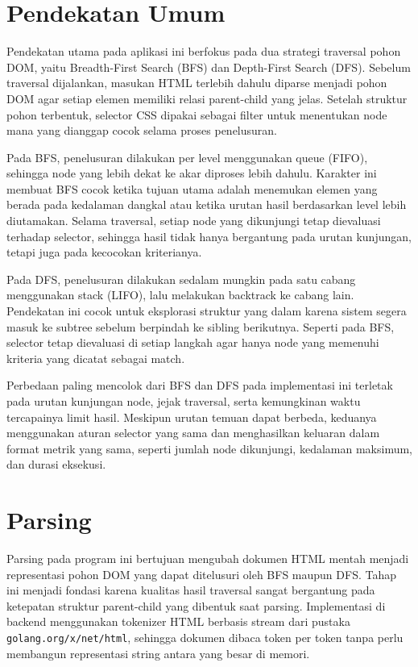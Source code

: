 \section{Pendekatan Umum}

Pendekatan utama pada aplikasi ini berfokus pada dua strategi traversal pohon DOM, yaitu Breadth-First Search (BFS) dan Depth-First Search (DFS). Sebelum traversal dijalankan, masukan HTML terlebih dahulu diparse menjadi pohon DOM agar setiap elemen memiliki relasi parent-child yang jelas. Setelah struktur pohon terbentuk, selector CSS dipakai sebagai filter untuk menentukan node mana yang dianggap cocok selama proses penelusuran.

Pada BFS, penelusuran dilakukan per level menggunakan queue (FIFO), sehingga node yang lebih dekat ke akar diproses lebih dahulu. Karakter ini membuat BFS cocok ketika tujuan utama adalah menemukan elemen yang berada pada kedalaman dangkal atau ketika urutan hasil berdasarkan level lebih diutamakan. Selama traversal, setiap node yang dikunjungi tetap dievaluasi terhadap selector, sehingga hasil tidak hanya bergantung pada urutan kunjungan, tetapi juga pada kecocokan kriterianya.

Pada DFS, penelusuran dilakukan sedalam mungkin pada satu cabang menggunakan stack (LIFO), lalu melakukan backtrack ke cabang lain. Pendekatan ini cocok untuk eksplorasi struktur yang dalam karena sistem segera masuk ke subtree sebelum berpindah ke sibling berikutnya. Seperti pada BFS, selector tetap dievaluasi di setiap langkah agar hanya node yang memenuhi kriteria yang dicatat sebagai match.

Perbedaan paling mencolok dari BFS dan DFS pada implementasi ini terletak pada urutan kunjungan node, jejak traversal, serta kemungkinan waktu tercapainya limit hasil. Meskipun urutan temuan dapat berbeda, keduanya menggunakan aturan selector yang sama dan menghasilkan keluaran dalam format metrik yang sama, seperti jumlah node dikunjungi, kedalaman maksimum, dan durasi eksekusi.

\section{Parsing}

Parsing pada program ini bertujuan mengubah dokumen HTML mentah menjadi representasi pohon DOM yang dapat ditelusuri oleh BFS maupun DFS. Tahap ini menjadi fondasi karena kualitas hasil traversal sangat bergantung pada ketepatan struktur parent-child yang dibentuk saat parsing. Implementasi di backend menggunakan tokenizer HTML berbasis stream dari pustaka \texttt{golang.org/x/net/html}, sehingga dokumen dibaca token per token tanpa perlu membangun representasi string antara yang besar di memori.

